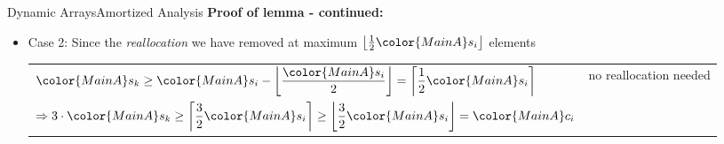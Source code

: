 
\begin{frame}{Dynamic Arrays}{Amortized Analysis}
  \textbf{Proof of lemma - continued:}
      \begin{itemize}
        \item
          Case 2: Since the \textit{reallocation} we have removed at
          maximum $\left\lfloor\frac{1}{2} {\color{MainA}s_i} \right\rfloor$
          elements
          \vspace{0.5em}\\
          \begin{tabularx}{\linewidth}{Xr}
           ${\color{MainA}s_k}
             \geq {\color{MainA}s_i} -
               \left\lfloor
                 \dfrac{\color{MainA}s_i}{2}
                 \vphantom{\dfrac{1}{2}}
               \right\rfloor
             = \left\lceil\dfrac{1}{2} {\color{MainA}s_i}\right\rceil$ &
           \multirow{2}{*}{\color{MainA}no reallocation needed}\\[1.0em]
           $\Rightarrow 3 \cdot {\color{MainA}s_k}
             \geq \left\lceil\dfrac{3}{2} {\color{MainA}s_i}\right\rceil
             \geq \left\lfloor\dfrac{3}{2} {\color{MainA}s_i}\right\rfloor
             = {\color{MainA}c_i}$
          \end{tabularx}
      \end{itemize}
\end{frame}


